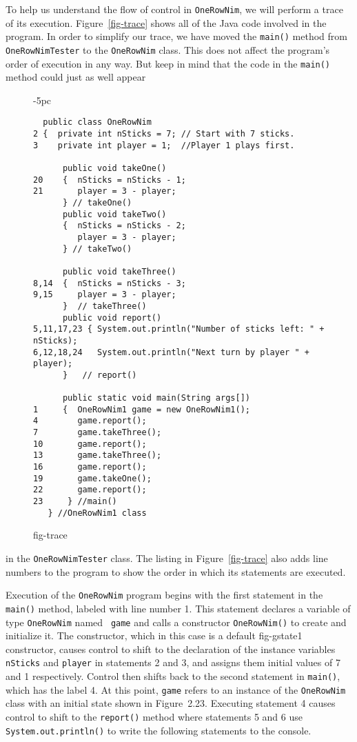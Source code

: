 \noindent To help us understand the flow of control in {\tt OneRowNim}, 
we will perform a trace of its execution. Figure~\ref{fig-trace} shows
all of the Java code involved in the program. In order to simplify our
trace, we have moved the {\tt main()} method from {\tt
OneRowNimTester} to the {\tt OneRowNim} class. This does not affect
the program's order of execution in any way. But keep in mind that the
code in the {\tt main()} method could just as well appear

\begin{figure}[tb]
\jjjprogstart
\begin{jjjlistingleft}[31pc]{-5pc}
\begin{lstlisting}
  public class OneRowNim 
2 {  private int nSticks = 7; // Start with 7 sticks.
3    private int player = 1;  //Player 1 plays first.

      public void takeOne()
20    {  nSticks = nSticks - 1;
21       player = 3 - player;  
      } // takeOne()
      public void takeTwo()
      {  nSticks = nSticks - 2;
         player = 3 - player; 
      } // takeTwo()

      public void takeThree()
8,14  {  nSticks = nSticks - 3;
9,15     player = 3 - player; 
      }  // takeThree()
      public void report()
5,11,17,23 { System.out.println("Number of sticks left: " + nSticks);
6,12,18,24   System.out.println("Next turn by player " + player);
      }   // report()

      public static void main(String args[])
1     {  OneRowNim1 game = new OneRowNim1();
4        game.report();
7        game.takeThree();
10       game.report();
13       game.takeThree();
16       game.report();
19       game.takeOne();
22       game.report();
23     } //main()
   } //OneRowNim1 class
\end{lstlisting}
\end{jjjlistingleft}
{fig-trace}
\end{figure}
in the {\tt OneRowNimTester} class.  The listing in
Figure~\ref{fig-trace} also adds line numbers to the program to show
the order in which its statements are executed.

Execution of the {\tt OneRowNim} program begins with the first
statement in the {\tt main()} method, labeled with line number 1.
This statement declares a variable of type {\tt OneRowNim} named {\tt
game} and calls a constructor {\tt OneRowNim()} to create and
initialize it.  The constructor, which in this case is a default
{fig-gstate1}
constructor, causes control to shift to the declaration of the
instance variables {\tt nSticks} and {\tt player} in statements 2 and
3, and assigns them initial values of 7 and 1 respectively.  Control
then shifts back to the second statement in {\tt main()}, which has
the label 4.  At this point, {\tt game} refers to an instance of the
{\tt OneRowNim} class with an initial state shown in
Figure~2.23.  Executing statement 4 causes control to
shift to the {\tt report()} method where statements 5 and 6 use {\tt
System.out.println()} to write the following statements to the
console.

